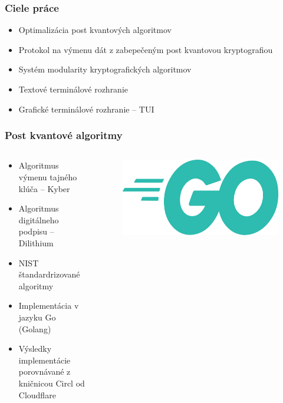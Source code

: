 \documentclass[%
  14pt,       				%
	t,                  %
	aspectratio=1610,   %
	unicode,						%
]{beamer}				    	%
\begin{document}
\disablenavigationsymbols


\maketitle
\newcommand{\npm}[2]{{#1}\,$\pm\,{#2}\%$}

\begin{frame}[c]
	\frametitle{Ciele práce}
	\large{\begin{itemize}
			\item Optimalizácia post kvantových algoritmov
			\item Protokol na výmenu dát z zabepečeným post kvantovou kryptografiou
			\item Systém modularity kryptografických algoritmov
			\item Textové terminálové rozhranie
			\item Grafické terminálové rozhranie -- TUI
		\end{itemize}
	}
\end{frame}

\begin{frame}[c]
	\frametitle{Post kvantové algoritmy}
	\begin{columns}[T]
		\begin{column}{0.8\textwidth}
			\large{\begin{itemize}
					\item Algoritmus výmenu tajného klúča -- Kyber
					\item Algoritmus digitálneho podpisu -- Dilithium
					\item NIST štandardrizované algoritmy
					\item Implementácia v jazyku Go (Golang)
					\item Výsledky implementácie porovnávané z kničnicou Circl od Cloudflare
				\end{itemize}
			}
		\end{column}
		\begin{column}{0.2\textwidth}
			\begin{figure}
				\includegraphics[width=\linewidth]{presentation_pictures/Golang_Logo.png}
			\end{figure}
		\end{column}
	\end{columns}
\end{frame}
\end{document}

